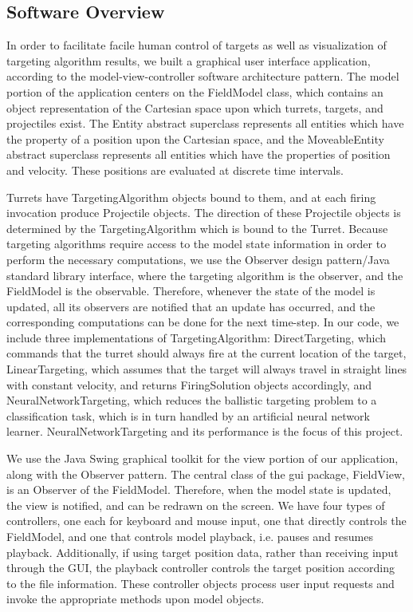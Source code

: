 \documentclass[11pt,letterpaper]{article}
\begin{document}
\subsection{Software Overview}
In order to facilitate facile human control of targets as well as visualization of targeting algorithm results, we built a graphical user interface application, according to the model-view-controller software architecture pattern. The model portion of the application centers on the FieldModel class, which contains an object representation of the Cartesian space upon which turrets, targets, and projectiles exist. The Entity abstract superclass represents all entities which have the property of a position upon the Cartesian space, and the MoveableEntity abstract superclass represents all entities which have the properties of position and velocity. These positions are evaluated at discrete time intervals.

Turrets have TargetingAlgorithm objects bound to them, and at each firing invocation produce Projectile objects. The direction of these Projectile objects is determined by the TargetingAlgorithm which is bound to the Turret. Because targeting algorithms require access to the model state information in order to perform the necessary computations, we use the Observer design pattern/Java standard library interface, where the targeting algorithm is the observer, and the FieldModel is the observable. Therefore, whenever the state of the model is updated, all its observers are notified that an update has occurred, and the corresponding computations can be done for the next time-step. In our code, we include three implementations of TargetingAlgorithm: DirectTargeting, which commands that the turret should always fire at the current location of the target, LinearTargeting, which assumes that the target will always travel in straight lines with constant velocity, and returns FiringSolution objects accordingly, and NeuralNetworkTargeting, which reduces the ballistic targeting problem to a classification task, which is in turn handled by an artificial neural network learner. NeuralNetworkTargeting and its performance is the focus of this project.

We use the Java Swing graphical toolkit for the view portion of our application, along with the Observer pattern. The central class of the gui package, FieldView, is an Observer of the FieldModel. Therefore, when the model state is updated, the view is notified, and can be redrawn on the screen.
We have four types of controllers, one each for keyboard and mouse input, one that directly controls the FieldModel, and one that controls model playback, i.e. pauses and resumes playback. Additionally, if using target position data, rather than receiving input through the GUI, the playback controller controls the target position according to the file information. These controller objects process user input requests and invoke the appropriate methods upon model objects.
\end{document}

